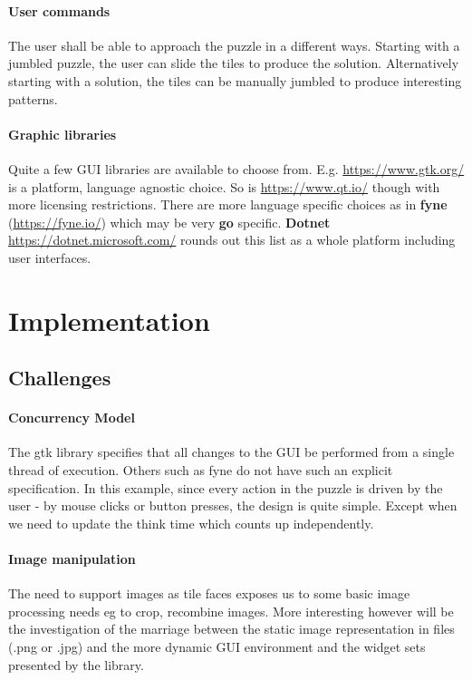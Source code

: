 \documentclass[a4paper,12pt]{article}
\theoremstyle{mytheor}
\begin{document}
\paragraph{User commands} The user shall be able to approach the puzzle in a different ways. Starting with a jumbled puzzle, the user can slide the tiles to produce the solution. Alternatively starting with a solution, the tiles can be manually jumbled to produce interesting patterns.

\paragraph{Graphic libraries} Quite a few GUI libraries are available to choose from. E.g. \url{https://www.gtk.org/} is a platform, language agnostic choice. So is \url{https://www.qt.io/} though with more licensing restrictions. There are more language specific choices as in \textbf{fyne} (\url{https://fyne.io/}) which may be very \textbf{go} specific. \textbf{Dotnet} \url{https://dotnet.microsoft.com/} rounds out this list as a whole platform including user interfaces.

\section*{Implementation}

\subsection*{Challenges}

\paragraph{Concurrency Model} The gtk library specifies that all changes to the GUI be performed from a single thread of execution. Others such as fyne do not have such an explicit specification. In this example, since every action in the puzzle is driven by the user - by mouse clicks or button presses, the design is quite simple. Except when we need to update the think time which counts up independently.

\paragraph{Image manipulation} The need to support images as tile faces exposes us to some basic image processing needs eg to crop, recombine images. More interesting however will be the investigation of the marriage between the static image representation in files (.png or .jpg) and the more dynamic GUI environment and the widget sets presented by the library.
\end{document}
